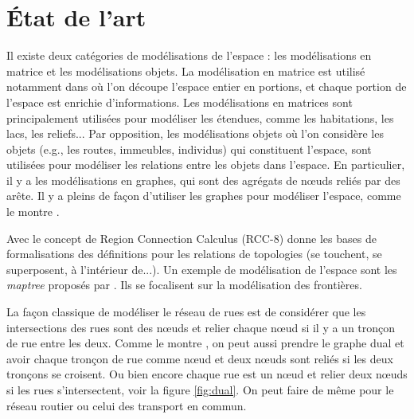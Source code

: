 \documentclass[a4paper]{article}
\begin{document}
\section{État de l'art}
\label{etat}

Il existe deux catégories de modélisations de l'espace : les modélisations en
matrice et les modélisations objets. La modélisation en matrice est utilisé
notamment dans \cite{batty1999} où l'on découpe l'espace entier en portions, et
chaque portion de l'espace est enrichie d'informations. Les modélisations en
matrices sont principalement utilisées pour modéliser les étendues, comme les
habitations, les lacs, les reliefs... Par opposition, les modélisations objets
où l'on considère les objets (e.g., les routes, immeubles, individus) qui
constituent l'espace, sont utilisées pour modéliser les relations entre les
objets dans l'espace. En particulier, il y a les modélisations en graphes, qui
sont des agrégats de nœuds reliés par des arête. Il y a pleins de façon
d'utiliser les graphes pour modéliser l'espace, comme le montre \cite{dale2010}.

Avec le concept de Region Connection Calculus (RCC-8) \cite{randell1992} donne
les bases de formalisations des définitions pour les relations de topologies (se
touchent, se superposent, à l'intérieur de...). Un exemple de modélisation de
l'espace sont les \emph{maptree} proposés par \cite{worboys2012}. Ils se
focalisent sur la modélisation des frontières.

La façon classique de modéliser le réseau de rues est de considérer que les
intersections des rues sont des nœuds et relier chaque nœud si il y a un tronçon
de rue entre les deux. Comme le montre \cite{porta2005}, on peut aussi prendre
le graphe dual et avoir chaque tronçon de rue comme nœud et deux nœuds sont
reliés si les deux tronçons se croisent. Ou bien encore chaque rue est un nœud
et relier deux nœuds si les rues s'intersectent, voir la figure \ref{fig:dual}.
On peut faire de même pour le réseau routier ou celui des transport en commun.
\end{document}
